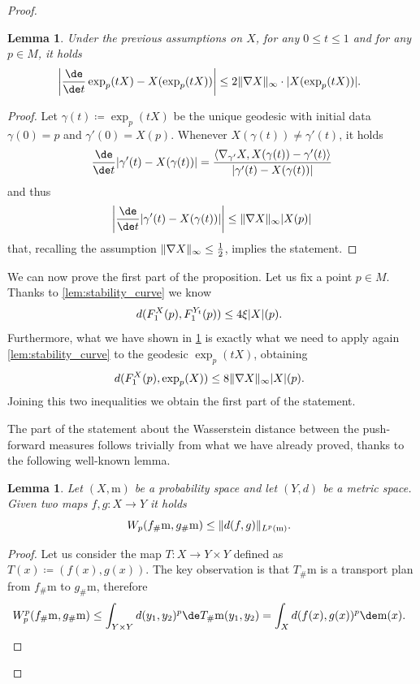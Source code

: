 \documentclass[JEP,XML,SOM,Unicode]{cedram}
\newcounter{results}[section]
\theoremstyle{plain}
\newtheorem{lemma}[results]{Lemma}
\theoremstyle{definition}
\numberwithin{equation}{section}
\newcommand{\defeq}{\ensuremath{\coloneqq}}
\newcommand{\fullstop}{\ensuremath{\text{. }}}
\newcommand{\m}{\ensuremath{\mathrm m}}
\newcommand{\scalprod}[2]{\ensuremath{\langle #1, #2\rangle}}
\DeclarePairedDelimiter\abs{\lvert}{\rvert}
\DeclarePairedDelimiter\norm{\lVert}{\rVert}
\begin{document}
\begin{proof}
\begin{lemma}\label{lem:derivative_geodesic}
Under the previous assumptions on $X$,
for any $0\le t\le 1$ and for any $p\in M$, it holds
\begin{equation*}
\abs*{\frac{\de}{\de t}\exp_p(tX)-X(\exp_p(tX))}\le
2\norm{\nabla X}_{\infty}\cdot\abs{X(\exp_p(tX))} \fullstop
\end{equation*}
\end{lemma}
\begin{proof}
Let $\gamma(t)\defeq \exp_p(tX)$ be the unique geodesic with initial data $\gamma(0)=p$ and
$\gamma'(0)=X(p)$.
Whenever $X(\gamma(t))\not=\gamma'(t)$, it holds
\begin{equation*}
\frac{\de}{\de t}\abs*{\gamma'(t)-X(\gamma(t))} =
\frac{\scalprod{\nabla_{\gamma'}X}{X(\gamma(t))-\gamma'(t)}}{\abs*{\gamma'(t)-X(\gamma(t))}}
\end{equation*}
and thus
\begin{equation*}
\abs*{\frac{\de}{\de t}\abs*{\gamma'(t)-X(\gamma(t))}} \le \norm{\nabla X}_\infty\abs{X(p)}
\end{equation*}
that, recalling the assumption $\norm{\nabla X}_\infty\le\frac12$, implies the statement.
\end{proof}

We can now prove the first part of the proposition.
Let us fix a point $p\in M$. Thanks to \cref{lem:stability_curve} we know
\begin{equation*}
d(F_1^X(p), F_1^{Y_t}(p)) \le 4\xi\abs{X}(p) \fullstop
\end{equation*}
Furthermore, what we have shown in \cref{lem:derivative_geodesic} is exactly what we need to apply again
\cref{lem:stability_curve} to the geodesic $\exp_p(tX)$, obtaining
\begin{equation*}
d(F_1^X(p), \exp_p(X)) \le 8\norm{\nabla X}_\infty\abs{X}(p) \fullstop
\end{equation*}
Joining this two inequalities we obtain the first part of the statement.

The part of the statement about the Wasserstein distance between the push-forward measures follows trivially
from what we have already proved, thanks to the following well-known lemma.

\begin{lemma}\label{lem:near_maps_near_measures}
Let $(X,\m)$ be a probability space and let $(Y, d)$ be a metric space.
Given two maps $f, g:X\to Y$ it holds
\begin{equation*}
W_p(f_\#\m, g_\#\m) \le \norm{d(f, g)}_{L^p(\m)}\fullstop
\end{equation*}
\end{lemma}
\begin{proof}
Let us consider the map $T:X\to Y\times Y$ defined as $T(x)\defeq (f(x), g(x))$.
The key observation is that $T_\#\m$ is a transport plan from $f_\#\m$ to $g_\#\m$, therefore
\begin{equation*}
W_p^p(f_\#\m, g_\#\m)\le\int_{Y\times Y} d(y_1, y_2)^p\de T_\#\m (y_1,y_2)
= \int_X d(f(x), g(x))^p\de\m(x) \fullstop\qedhere
\end{equation*}
\end{proof}
\skipqed
\end{proof}
\end{document}

